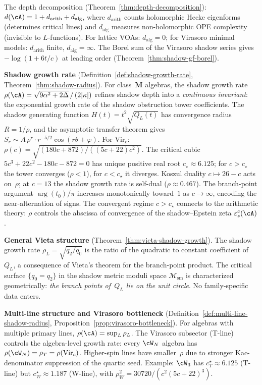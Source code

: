 \smallskip\noindent
The depth decomposition
(Theorem~\ref{thm:depth-decomposition}):
$d(\cA) = 1 + d_{\mathrm{arith}} + d_{\mathrm{alg}}$,
where $d_{\mathrm{arith}}$ counts holomorphic Hecke eigenforms
(determines critical lines) and $d_{\mathrm{alg}}$ measures
non-holomorphic OPE complexity (invisible to $L$-functions).
For lattice VOAs: $d_{\mathrm{alg}} = 0$; for Virasoro
minimal models: $d_{\mathrm{arith}}$ finite,
$d_{\mathrm{alg}} = \infty$. The Borel sum of the
Virasoro shadow series gives $-\log(1 + 6t/c)$ at leading
order (Theorem~\ref{thm:shadow-gf-borel}).

\smallskip\noindent\textbf{Shadow growth rate}
(Definition~\ref{def:shadow-growth-rate},
Theorem~\ref{thm:shadow-radius}).
For class~$\mathbf{M}$ algebras, the shadow growth rate
$\rho(\cA) = \sqrt{9\alpha^2 + 2\Delta}\,/\,(2|\kappa|)$
refines shadow depth into a \emph{continuous invariant}:
the exponential growth rate of the shadow obstruction tower coefficients.
The shadow generating function
$H(t) = t^2\sqrt{Q_L(t)}$ has convergence
radius $R = 1/\rho$, and the asymptotic transfer theorem
gives $S_r \sim A\,\rho^r \cdot r^{-5/2}\cos(r\theta + \varphi)$.
For $\mathrm{Vir}_c$:
$\rho(c) = \sqrt{(180c{+}872)/((5c{+}22)c^2)}$.
The critical cubic $5c^3 + 22c^2 - 180c - 872 = 0$ has unique
positive real root $c_\star \approx 6.125$; for
$c > c_\star$ the tower converges ($\rho < 1$), for
$c < c_\star$ it diverges. Koszul duality
$c \mapsto 26 - c$ acts on~$\rho$; at $c = 13$
the shadow growth rate is self-dual ($\rho \approx 0.467$).
The branch-point argument
$\arg(t_0)/\pi$ increases monotonically toward~$1$ as
$c \to \infty$, encoding the near-alternation of signs.
The convergent regime $c > c_\star$ connects to the
arithmetic theory: $\rho$ controls the abscissa of
convergence of the shadow--Epstein zeta
$\varepsilon^c_s(\cA)$.

\smallskip\noindent\textbf{General Vieta structure}
(Theorem~\ref{thm:vieta-shadow-growth}).
The shadow growth rate $\rho_L = \sqrt{q_2/q_0}$ is the
ratio of the quadratic to constant coefficient of~$Q_L$,
a consequence of Vieta's theorem for the
branch-point product.
The critical surface $\{q_0 = q_2\}$ in the shadow metric
moduli space $\mathcal{M}_{\mathrm{sm}}$ is
characterized geometrically:
\emph{the branch points of~$Q_L$ lie on the unit circle}.
No family-specific data enters.

\smallskip\noindent\textbf{Multi-line structure and Virasoro bottleneck}
(Definition~\ref{def:multi-line-shadow-radius},
Proposition~\ref{prop:virasoro-bottleneck}).
For algebras with multiple primary lines,
$\rho(\cA) = \sup_L \rho_L$.
The Virasoro subsector (T-line) controls the
algebra-level growth rate: every $\cW_N$ algebra has
$\rho(\cW_N) = \rho_T = \rho(\mathrm{Vir}_c)$.
Higher-spin lines have smaller~$\rho$ due to stronger
Kac-denominator suppression of the quartic seed.
Example: $\cW_3$ has $c_T^\star \approx 6.125$
(T-line) but $c_W^\star \approx 1.187$ (W-line),
with $\rho_W^2 = 30720/(c^2(5c{+}22)^3)$.

